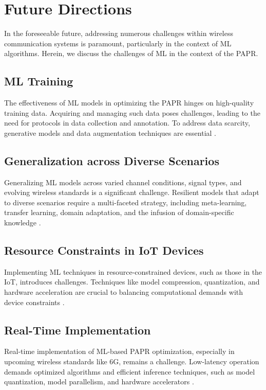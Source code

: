 \documentclass[conference]{IEEEtran}
\begin{document}
\section{Future Directions}
In the foreseeable future, addressing numerous challenges within wireless communication systems is paramount, particularly in the context of ML algorithms. Herein, we discuss the challenges of ML in the context of the PAPR.

\subsection{ML Training}
The effectiveness of ML models in optimizing the PAPR hinges on high-quality training data. Acquiring and managing such data poses challenges, leading to the need for protocols in data collection and annotation. To address data scarcity, generative models and data augmentation techniques are essential \cite{b45, b166}.

\subsection{Generalization across Diverse Scenarios}
Generalizing ML models across varied channel conditions, signal types, and evolving wireless standards is a significant challenge. Resilient models that adapt to diverse scenarios require a multi-faceted strategy, including meta-learning, transfer learning, domain adaptation, and the infusion of domain-specific knowledge \cite{b45, b166}.

\subsection{Resource Constraints in IoT Devices}
Implementing ML techniques in resource-constrained devices, such as those in the IoT, introduces challenges. Techniques like model compression, quantization, and hardware acceleration are crucial to balancing computational demands with device constraints \cite{b167, b168, b169}.

\subsection{Real-Time Implementation}
Real-time implementation of ML-based PAPR optimization, especially in upcoming wireless standards like 6G, remains a challenge. Low-latency operation demands optimized algorithms and efficient inference techniques, such as model quantization, model parallelism, and hardware accelerators \cite{b170, b171, b172}.
\end{document}
